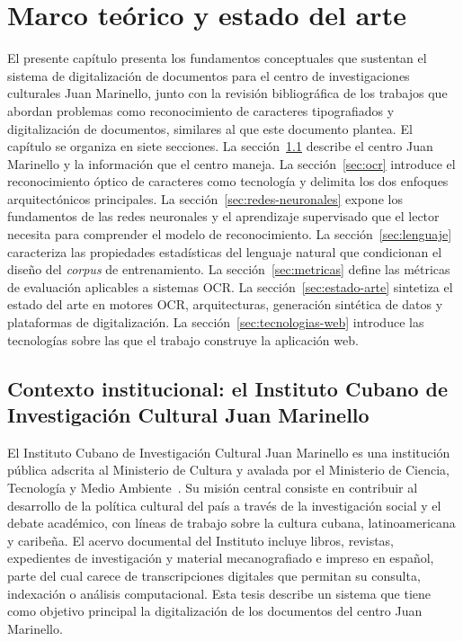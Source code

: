 \setcounter{chapter}{0}

\chapter{Marco teórico y estado del arte}\label{chap:estado-arte}

El presente capítulo presenta los fundamentos conceptuales que sustentan el sistema de digitalización de documentos para el centro de investigaciones culturales Juan Marinello, junto con la revisión bibliográfica de los trabajos que abordan problemas como reconocimiento de caracteres tipografiados y digitalización de documentos, similares al que este documento plantea. El capítulo se organiza en siete secciones. La sección~\ref{sec:contexto-icic} describe el centro Juan Marinello y la información que el centro maneja. La sección~\ref{sec:ocr} introduce el reconocimiento óptico de caracteres como tecnología y delimita los dos enfoques arquitectónicos principales. La sección~\ref{sec:redes-neuronales} expone los fundamentos de las redes neuronales y el aprendizaje supervisado que el lector necesita para comprender el modelo de reconocimiento. La sección~\ref{sec:lenguaje} caracteriza las propiedades estadísticas del lenguaje natural que condicionan el diseño del \textit{corpus} de entrenamiento. La sección~\ref{sec:metricas} define las métricas de evaluación aplicables a sistemas OCR. La sección~\ref{sec:estado-arte} sintetiza el estado del arte en motores OCR, arquitecturas, generación sintética de datos y plataformas de digitalización. La sección~\ref{sec:tecnologias-web} introduce las tecnologías sobre las que el trabajo construye la aplicación web.

\section{Contexto institucional: el Instituto Cubano de Investigación Cultural Juan Marinello}
\label{sec:contexto-icic}

El Instituto Cubano de Investigación Cultural Juan Marinello es una institución pública adscrita al Ministerio de Cultura y avalada por el Ministerio de Ciencia, Tecnología y Medio Ambiente~\cite{icic2024}. Su misión central consiste en contribuir al desarrollo de la política cultural del país a través de la investigación social y el debate académico, con líneas de trabajo sobre la cultura cubana, latinoamericana y caribeña. El acervo documental del Instituto incluye libros, revistas, expedientes de investigación y material mecanografiado e impreso en español, parte del cual carece de transcripciones digitales que permitan su consulta, indexación o análisis computacional. Esta tesis describe un sistema que tiene como objetivo principal la digitalización de los documentos del centro Juan Marinello.

